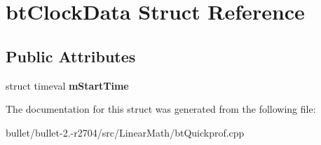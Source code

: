 \hypertarget{structbt_clock_data}{\section{bt\+Clock\+Data Struct Reference}
\label{structbt_clock_data}
}
\subsection*{Public Attributes}
\begin{DoxyCompactItemize}
\item 
\hypertarget{structbt_clock_data_a1fec47321c4890e5ea9f48743c7007e0}{struct timeval {\bfseries m\+Start\+Time}}\label{structbt_clock_data_a1fec47321c4890e5ea9f48743c7007e0}

\end{DoxyCompactItemize}


The documentation for this struct was generated from the following file\+:\begin{DoxyCompactItemize}
\item 
bullet/bullet-\/2.-\/r2704/src/\+Linear\+Math/bt\+Quickprof.\+cpp\end{DoxyCompactItemize}
